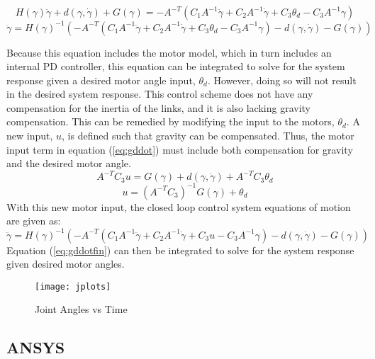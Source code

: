 \[
H(\gamma) \ddot{\gamma}+d(\gamma, \dot{\gamma})+G(\gamma)=-A^{-T}\left(C_1A^{-1} \ddot{\gamma}+C_2 A^{-1} \dot{\gamma}+C_3 \theta_{d}- C_3A^{-1} \gamma\right)
\]
\begin{equation}
\ddot{\gamma}=H(\gamma)^{-1}\left(-A^{-T}\left(C_1 A^{-1} \ddot{\gamma}+C_2 A^{-1} \dot{\gamma}+C_3 \theta_{d}-C_3A^{-1} \gamma\right)-d(\gamma, \dot{\gamma})-G(\gamma)\right)
\label{eq:gddot}
\end{equation}

Because this equation includes the motor model, which in turn includes an internal PD controller, this equation can be integrated to solve for the system response given a desired motor angle input, $\theta_d$. However, doing so will not result in the desired system response. This control scheme does not have any compensation for the inertia of the links, and it is also lacking gravity compensation. This can be remedied by modifying the input to the motors, $\theta_d$. A new input, $u$, is defined such that gravity can be compensated. Thus, the motor input term in equation (\ref{eq:gddot}) must include both compensation for gravity and the desired motor angle.
\[
A^{-T} C_3  u=G(\gamma)+d(\gamma, \dot{\gamma})+A^{-T} C_3\theta_{d}
\]
\begin{equation}
u=\left(A^{-T} C_3\right)^{-1} G(\gamma)+\theta_{d}
\end{equation}
With this new motor input, the closed loop control system equations of motion are given as:
\begin{equation}
\ddot{\gamma}=H(\gamma)^{-1}\left(-A^{-T}\left(C_1 A^{-1} \ddot{\gamma}+C_2 A^{-1} \dot{\gamma}+C_3 u-C_3A^{-1} \gamma\right)-d(\gamma, \dot{\gamma})-G(\gamma)\right)
\label{eq:gddotfin}
\end{equation}
Equation (\ref{eq:gddotfin}) can then be integrated to solve for the system response given desired motor angles.

\begin{figure}[htp]
  \center
  \texttt{[image: jplots]}
  \caption{Joint Angles vs Time}
  \label{fig:jplots}
\end{figure}


\newpage
\subsection{ANSYS}
\newpage

